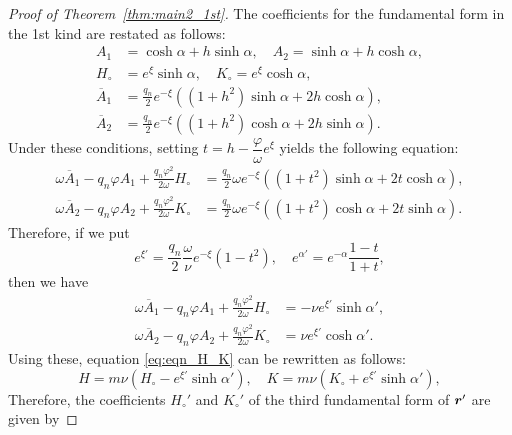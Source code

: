 \documentclass[a4paper]{amsart}
\def\br{\mbox{\boldmath $r$}}
\theoremstyle{definition}
\begin{document}
%
\begin{proof}[Proof of Theorem~\ref{thm:main2_1st}]
The coefficients for the fundamental form in the 1st kind are restated as follows:
\begin{equation}
\begin{aligned}
A_1 &= \cosh \alpha + h \sinh \alpha, \quad
A_2 = \sinh \alpha + h \cosh \alpha,\\
H_\circ &= e^\xi \sinh \alpha, \quad
K_\circ = e^\xi \cosh \alpha,\\
\overline{A}_1 &= \frac{q_n}{2} e^{-\xi} ((1+h^2)\sinh \alpha + 2h \cosh \alpha),\\
\overline{A}_2 &= \frac{q_n}{2} e^{-\xi} ((1+h^2)\cosh \alpha + 2h \sinh \alpha).
\end{aligned}
\end{equation}
Under these conditions, setting $t = h - \dfrac{\varphi}{\omega} e^\xi$ yields the following equation:
\begin{equation}
\begin{aligned}
\omega \overline{A}_1 - q_n \varphi A_1 + \frac{q_n \varphi^2}{2\omega} H_\circ
&= \frac{q_n}{2} \omega e^{-\xi} ((1+t^2) \sinh \alpha + 2t \cosh \alpha),\\
\omega \overline{A}_2 - q_n \varphi A_2 + \frac{q_n \varphi^2}{2\omega} K_\circ
&= \frac{q_n}{2} \omega e^{-\xi} ((1+t^2) \cosh \alpha + 2t \sinh \alpha).
\end{aligned}
\end{equation}
Therefore, if we put
\begin{equation}
e^{\xi'} = \frac{q_n}{2} \frac{\omega}{\nu} e^{-\xi} (1-t^2), \quad
e^{\alpha'} = e^{-\alpha} \frac{1-t}{1+t},
\end{equation}
then we have
\begin{equation}
\begin{aligned}
\omega \overline{A}_1 - q_n \varphi A_1 + \frac{q_n \varphi^2}{2\omega} H_\circ
&= -\nu e^{\xi'} \sinh \alpha',\\
\omega \overline{A}_2 - q_n \varphi A_2 + \frac{q_n \varphi^2}{2\omega} K_\circ
&= \nu e^{\xi'} \cosh \alpha'.
\end{aligned}
\end{equation}
Using these, equation \eqref{eq:eqn_H_K} can be rewritten as follows:
\begin{equation}
H = m\nu (H_\circ - e^{\xi'} \sinh \alpha'), \quad
K = m\nu (K_\circ + e^{\xi'} \sinh \alpha'),
\end{equation}
Therefore, the coefficients $H_\circ'$ and $K_\circ'$ of the third fundamental form of $\br'$ are given by

\end{proof}
\end{document}
